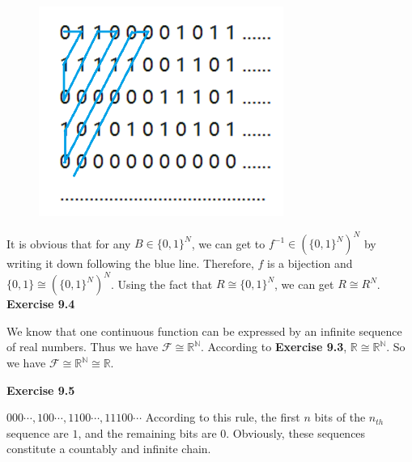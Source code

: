 \documentclass{article} %
\begin{document}
\begin{figure}[H]
    \centering
    \includegraphics[width=8cm]{9_3_1.png}
    \caption{}
    \label{}
    \end{figure}
It is obvious that for any $B\in \{0,1\}^N$, we can get to $f^{-1}\in (\{0,1\}^N)^N$ by writing it down following the blue line. Therefore, $f$ is a bijection and $\{0,1\}\cong (\{0,1\}^N)^N$. Using the fact that $R\cong \{0,1\}^N$, we can get $R\cong R^N$.
	\textbf{Exercise 9.4}\par
	We know that one continuous function can be expressed by an infinite sequence of real numbers. 
	Thus we have   $\mathcal{F} \cong \mathbb{R}^{\mathbb{N}}$. According to \textbf{Exercise 9.3},  $\mathbb{R} \cong \mathbb{R}^{\mathbb{N}}$.
	So we have $\mathcal{F} \cong \mathbb{R}^{\mathbb{N}} \cong \mathbb{R}$.\par

	\textbf{Exercise 9.5}\par
    $000\cdots,100\cdots,1100\cdots,11100\cdots$ According to this rule, the first $n$ bits of the $n_{th}$ sequence are $1$, and the remaining bits are $0$. Obviously, these sequences constitute a countably and infinite chain.
	
\end{document}
